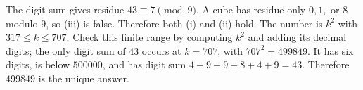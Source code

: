 The digit sum gives residue $43\equiv7\pmod9$. A cube has residue only $0,1,$ or $8$ modulo $9$, so (iii) is false. Therefore both (i) and (ii) hold. The number is $k^2$ with $317\le k\le707$. Check this finite range by computing $k^2$ and adding its decimal digits; the only digit sum of $43$ occurs at $k=707$, with $707^2=499849$. It has six digits, is below $500000$, and has digit sum $4+9+9+8+4+9=43$. Therefore $\boxed{499849}$ is the unique answer.
